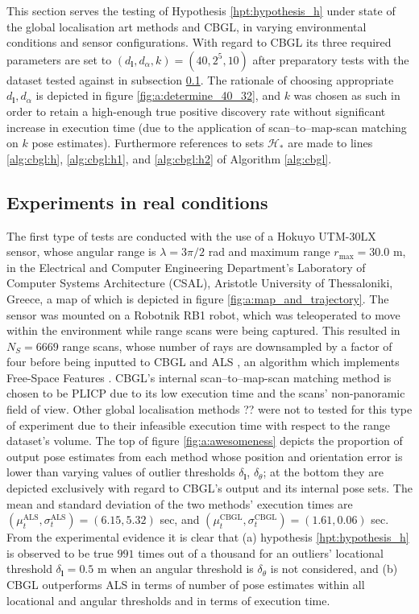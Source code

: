 This section serves the testing of Hypothesis \ref{hpt:hypothesis_h} under
state of the global localisation art methods and CBGL, in varying environmental
conditions and sensor configurations. With regard to CBGL its three required
parameters are set to $(d_{\bm{l}},d_{\alpha},k) = (40, 2^5, 10)$ after
preparatory tests with the dataset tested against in subsection
\ref{subsec:exp_in_re_co}. The rationale of choosing appropriate
$d_{\bm{l}},d_{\alpha}$ is depicted in figure \ref{fig:a:determine_40_32}, and
$k$ was chosen as such in order to retain a high-enough true positive discovery
rate without significant increase in execution time (due to the application of
scan--to--map-scan matching on $k$ pose estimates). Furthermore references to
sets $\mathcal{H}_{\ast}$ are made to lines \ref{alg:cbgl:h},
\ref{alg:cbgl:h1}, and \ref{alg:cbgl:h2} of Algorithm \ref{alg:cbgl}.


\subsection{Experiments in real conditions}
\label{subsec:exp_in_re_co}

The first type of tests are conducted with the use of a Hokuyo UTM-30LX
sensor, whose angular range is $\lambda = 3\pi/2$ rad and maximum range
$r_{\max} = 30.0$ m, in the  Electrical and Computer Engineering Department's
Laboratory of Computer Systems Architecture (CSAL), Aristotle University of
Thessaloniki, Greece, a map of which is depicted in figure
\ref{fig:a:map_and_trajectory}. The sensor was mounted on a Robotnik RB1 robot,
which was teleoperated to move within the environment while range scans were
being captured. This resulted in $N_{S}=6669$ range scans, whose number of rays
are downsampled by a factor of four before being inputted to CBGL and ALS
\cite{als_jp}, an algorithm which implements Free-Space Features
\cite{als_eth}. CBGL's internal scan--to--map-scan matching method is chosen
to be PLICP \cite{Censi2008c} due to its low execution time and the scans'
non-panoramic field of view.  Other global localisation methods ?? were not to
tested for this type of experiment due to their infeasible execution time with
respect to the range dataset's volume. The top of figure \ref{fig:a:awesomeness}
depicts the proportion of output pose estimates from each method whose position
and orientation error is lower than varying values of outlier thresholds
$\delta_{\bm{l}}$, $\delta_{\theta}$; at the bottom they are depicted
exclusively with regard to CBGL's output and its internal pose sets. The mean
and standard deviation of the two methods' execution times are
$(\mu_t^{\text{ALS}}, \sigma_t^{\text{ALS}}) = (6.15, 5.32)$ sec,
and $(\mu_t^{\text{CBGL}}, \sigma_t^{\text{CBGL}}) = (1.61, 0.06)$
sec. From the experimental evidence it is clear that (a) hypothesis
\ref{hpt:hypothesis_h} is observed to be true $991$ times out of a thousand for
an outliers' locational threshold $\delta_{\bm{l}} = 0.5$ m when an angular
threshold is $\delta_{\theta}$ is not considered, and (b) CBGL outperforms ALS
in terms of number of pose estimates within all locational and angular
thresholds and in terms of execution time.

